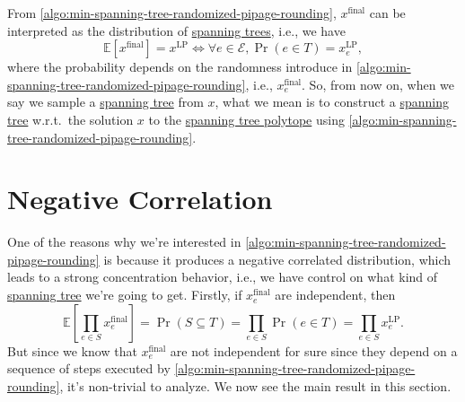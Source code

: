 From \autoref{algo:min-spanning-tree-randomized-pipage-rounding}, \(x^{\text{final} }\) can be interpreted as the distribution of \hyperref[def:spanning-tree]{spanning trees}, i.e., we have
\[
	\mathbb{E}\left[x^{\text{final} } \right] = x^{\text{LP} } \iff \forall e\in \mathcal{E}, \Pr(e\in T) = x_e^{\text{LP} },
\]
where the probability depends on the randomness introduce in \autoref{algo:min-spanning-tree-randomized-pipage-rounding}, i.e., \(x_e^{\text{final} } \). So, from now on, when we say we sample a \hyperref[def:spanning-tree]{spanning tree} from \(x\), what we mean is to construct a \hyperref[def:spanning-tree]{spanning tree} w.r.t.\ the solution \(x\) to the \hyperref[eq:spanning-tree-polytope]{spanning tree polytope} using \autoref{algo:min-spanning-tree-randomized-pipage-rounding}.

\section{Negative Correlation}
One of the reasons why we're interested in \autoref{algo:min-spanning-tree-randomized-pipage-rounding} is because it produces a negative correlated distribution, which leads to a strong concentration behavior, i.e., we have control on what kind of \hyperref[def:spanning-tree]{spanning tree} we're going to get. Firstly, if \(x_e^{\text{final} } \) are independent, then
\[
	\mathbb{E}\left[\prod_{e\in S} x^{\text{final} }_e \right] = \Pr(S \subseteq T) = \prod_{e\in S} \Pr(e\in T) = \prod_{e\in S} x^{\text{LP} }_e.
\]
But since we know that \(x_e^{\text{final} }\) are not independent for sure since they depend on a sequence of steps executed by \autoref{algo:min-spanning-tree-randomized-pipage-rounding}, it's non-trivial to analyze. We now see the main result in this section.

